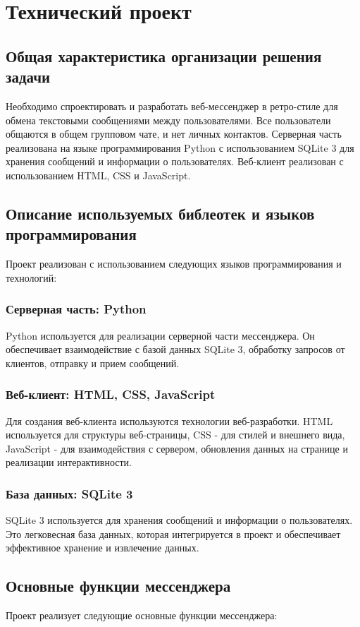 \section{Технический проект}
\subsection{Общая характеристика организации решения задачи}
Необходимо спроектировать и разработать веб-мессенджер в ретро-стиле для обмена текстовыми сообщениями между пользователями. Все пользователи общаются в общем групповом чате, и нет личных контактов. Серверная часть реализована на языке программирования Python с использованием SQLite 3 для хранения сообщений и информации о пользователях. Веб-клиент реализован с использованием HTML, CSS и JavaScript.

\subsection{Описание используемых библеотек и языков программирования}
Проект реализован с использованием следующих языков программирования и технологий:

\subsubsection{Серверная часть: Python}
Python используется для реализации серверной части мессенджера. Он обеспечивает взаимодействие с базой данных SQLite 3, обработку запросов от клиентов, отправку и прием сообщений.

\subsubsection{Веб-клиент: HTML, CSS, JavaScript}
Для создания веб-клиента используются технологии веб-разработки. HTML используется для структуры веб-страницы, CSS - для стилей и внешнего вида, JavaScript - для взаимодействия с сервером, обновления данных на странице и реализации интерактивности.

\subsubsection{База данных: SQLite 3}
SQLite 3 используется для хранения сообщений и информации о пользователях. Это легковесная база данных, которая интегрируется в проект и обеспечивает эффективное хранение и извлечение данных.

\subsection{Основные функции мессенджера}
Проект реализует следующие основные функции мессенджера:

